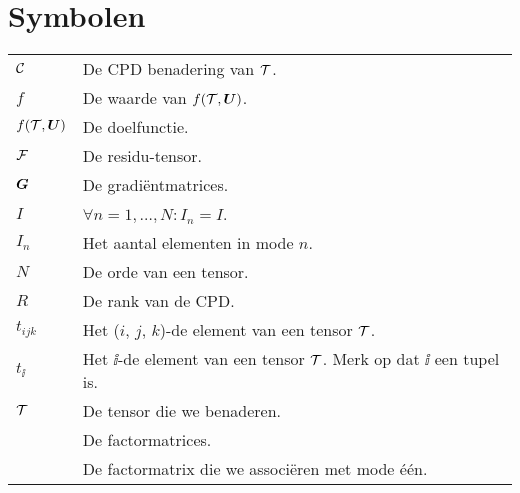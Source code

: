 \documentclass[master=cws ,masteroption=gs]{kulemt}
\begin{document}
\section*{Symbolen}
\begin{flushleft}
	\renewcommand{\arraystretch}{1.1}
	\begin{tabularx}{\textwidth}{@{}p{12mm}X@{}}
		$\mathcal{C}$	& De CPD benadering van $\mathcal{T}$.\\
		$f$				& De waarde van $f(\mathcal{T}, \boldsymbol{U})$.\\
		$f(\mathcal{T}, \boldsymbol{U})$	& De doelfunctie.\\
		$\mathcal{F}$		& De residu-tensor.\\
		$\boldsymbol{G}$			& De gradi\"entmatrices.\\
		$I$				& $\forall n = 1, \ldots, N: I_n = I$.\\
		$I_n$			& Het aantal elementen in mode $n$.\\
		$N$				& De orde van een tensor.\\
		$R$				& De rank van de CPD.\\
		$t_{ijk}$		& Het ($i$, $j$, $k$)-de element van een tensor $\mathcal{T}$.\\
		$t_{\ii}$		& Het $\ii$-de element van een tensor $\mathcal{T}$. Merk op dat $\ii$ een tupel is.\\
		$\mathcal{T}$		& De tensor die we benaderen.\\
		\UUU{}			& De factormatrices.\\
		\UU{1}			& De factormatrix die we associ\"eren met mode \'e\'en.\\
	\end{tabularx}
\end{flushleft}

\mainmatter










\appendixpage*          %
\appendix

%

\backmatter


\end{document}
